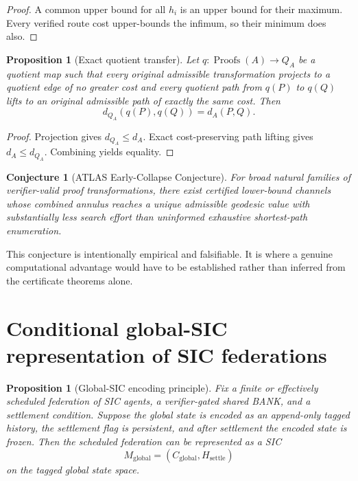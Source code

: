 \documentclass[11pt]{article}
\newtheorem{proposition}[theorem]{Proposition}
\newtheorem{conjecture}[theorem]{Conjecture}
\theoremstyle{definition}
\newcommand{\Proofs}{\operatorname{Proofs}}
\begin{document}
\begin{proof}
A common upper bound for all $h_i$ is an upper bound for their maximum.  Every verified route cost upper-bounds the infimum, so their minimum does also.
\end{proof}

\begin{proposition}[Exact quotient transfer]\label{prop:exact-quotient}
Let $q:\Proofs(A)\to Q_A$ be a quotient map such that every original admissible transformation projects to a quotient edge of no greater cost and every quotient path from $q(P)$ to $q(Q)$ lifts to an original admissible path of exactly the same cost.  Then
\[
\boxed{d_{Q_A}(q(P),q(Q))=d_A(P,Q).}
\]
\end{proposition}

\begin{proof}
Projection gives $d_{Q_A}\le d_A$.  Exact cost-preserving path lifting gives $d_A\le d_{Q_A}$.  Combining yields equality.
\end{proof}

\begin{conjecture}[ATLAS Early-Collapse Conjecture]
For broad natural families of verifier-valid proof transformations, there exist certified lower-bound channels whose combined annulus reaches a unique admissible geodesic value with substantially less search effort than uninformed exhaustive shortest-path enumeration.
\end{conjecture}

This conjecture is intentionally empirical and falsifiable.  It is where a genuine computational advantage would have to be established rather than inferred from the certificate theorems alone.

\section{Conditional global-SIC representation of SIC federations}

\begin{proposition}[Global-SIC encoding principle]\label{prop:global-sic}
Fix a finite or effectively scheduled federation of SIC agents, a verifier-gated shared BANK, and a settlement condition.  Suppose the global state is encoded as an append-only tagged history, the settlement flag is persistent, and after settlement the encoded state is frozen.  Then the scheduled federation can be represented as a SIC
\[
M_{\mathrm{global}}=(C_{\mathrm{global}},H_{\mathrm{settle}})
\]
on the tagged global state space.
\end{proposition}
\end{document}
